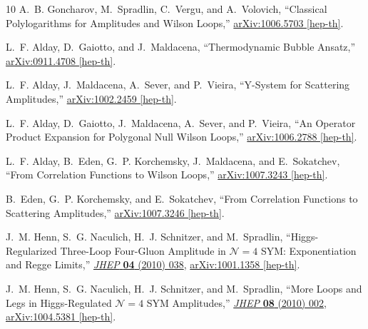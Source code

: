 \documentclass[11pt, reqno]{article}
\begin{document}
\begin{thebibliography}{10}
A.~B. Goncharov, M.~Spradlin, C.~Vergu, and A.~Volovich, ``{Classical
  Polylogarithms for Amplitudes and Wilson Loops},''
\href{http://arxiv.org/abs/1006.5703}{{ arXiv:1006.5703 [hep-th]}}.

L.~F. Alday, D.~Gaiotto, and J.~Maldacena, ``{Thermodynamic Bubble Ansatz},''
\href{http://arxiv.org/abs/0911.4708}{{ arXiv:0911.4708 [hep-th]}}.

L.~F. Alday, J.~Maldacena, A.~Sever, and P.~Vieira, ``{Y-System for Scattering
  Amplitudes},''
\href{http://arxiv.org/abs/1002.2459}{{ arXiv:1002.2459 [hep-th]}}.

L.~F. Alday, D.~Gaiotto, J.~Maldacena, A.~Sever, and P.~Vieira, ``{An Operator
  Product Expansion for Polygonal Null Wilson Loops},''
\href{http://arxiv.org/abs/1006.2788}{{ arXiv:1006.2788 [hep-th]}}.

L.~F. Alday, B.~Eden, G.~P. Korchemsky, J.~Maldacena, and E.~Sokatchev, ``{From
  Correlation Functions to Wilson Loops},''
\href{http://arxiv.org/abs/1007.3243}{{ arXiv:1007.3243 [hep-th]}}.

B.~Eden, G.~P. Korchemsky, and E.~Sokatchev, ``{From Correlation Functions to
  Scattering Amplitudes},''
\href{http://arxiv.org/abs/1007.3246}{{ arXiv:1007.3246 [hep-th]}}.

J.~M. Henn, S.~G. Naculich, H.~J. Schnitzer, and M.~Spradlin,
  ``{Higgs-Regularized Three-Loop Four-Gluon Amplitude in $\mathcal{N}=4$ SYM:
  Exponentiation and Regge Limits},''
  \href{http://dx.doi.org/10.1007/JHEP04(2010)038}{{\em JHEP} {\bf 04} (2010)
  038},
\href{http://arxiv.org/abs/1001.1358}{{ arXiv:1001.1358 [hep-th]}}.

J.~M. Henn, S.~G. Naculich, H.~J. Schnitzer, and M.~Spradlin, ``{More Loops and
  Legs in Higgs-Regulated $\mathcal{N}=4$ SYM Amplitudes},''
  \href{http://dx.doi.org/10.1007/JHEP08(2010)002}{{\em JHEP} {\bf 08} (2010)
  002},
\href{http://arxiv.org/abs/1004.5381}{{ arXiv:1004.5381 [hep-th]}}.

\end{thebibliography}\endgroup
\end{document}
